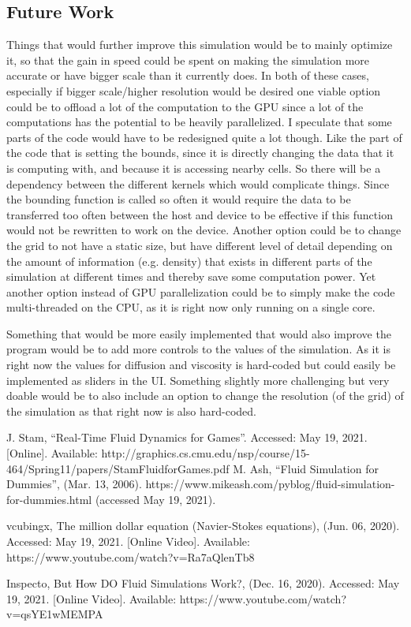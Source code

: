 \documentclass{article}
\begin{document}
\begin{multicols}{2}
\section{Future Work}
Things that would further improve this simulation would be to mainly optimize it, so that the gain in speed could be spent on making the simulation more accurate or have bigger scale than it currently does. In both of these cases, especially if bigger scale/higher resolution would be desired one viable option could be to offload a lot of the computation to the GPU since a lot of the computations has the potential to be heavily parallelized. I speculate that some parts of the code would have to be redesigned quite a lot though. Like the part of the code that is setting the bounds, since it is directly changing the data that it is computing with, and because it is accessing nearby cells. So there will be a dependency between the different kernels which would complicate things. Since the bounding function is called so often it would require the data to be transferred too often between the host and device to be effective if this function would not be rewritten to work on the device. Another option could be to change the grid to not have a static size, but have different level of detail depending on the amount of information (e.g. density) that exists in different parts of the simulation at different times and thereby save some computation power. Yet another option instead of GPU parallelization could be to simply make the code multi-threaded on the CPU, as it is right now only running on a single core.

Something that would be more easily implemented that would also improve the program would be to add more controls to the values of the simulation. As it is right now the values for diffusion and viscosity is hard-coded but could easily be implemented as sliders in the UI. Something slightly more challenging but very doable would be to also include an option to change the resolution (of the grid) of the simulation as that right now is also hard-coded.
\end{multicols}

\begin{thebibliography}{9}
J. Stam, “Real-Time Fluid Dynamics for Games”. Accessed: May 19, 2021. [Online]. Available: http://graphics.cs.cmu.edu/nsp/course/15-464/Spring11/papers/StamFluidforGames.pdf
M. Ash, “Fluid Simulation for Dummies”, (Mar. 13, 2006). https://www.mikeash.com/pyblog/fluid-simulation-for-dummies.html (accessed May 19, 2021).

vcubingx, The million dollar equation (Navier-Stokes equations), (Jun. 06, 2020). Accessed: May 19, 2021. [Online Video]. Available: https://www.youtube.com/watch?v=Ra7aQlenTb8

Inspecto, But How DO Fluid Simulations Work?, (Dec. 16, 2020). Accessed: May 19, 2021. [Online Video]. Available: https://www.youtube.com/watch?v=qsYE1wMEMPA

\end{thebibliography}
\end{document}
